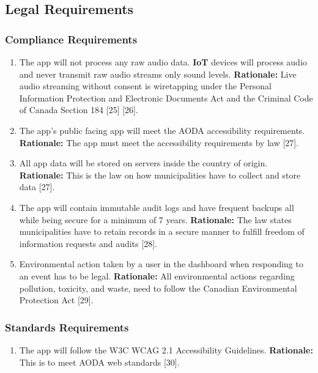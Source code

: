 \documentclass[]{article}
\begin{document}

\subsection{Legal Requirements}
\label{sub:legal_requirements}

\subsubsection{Compliance Requirements}
\label{ssub:compliance_requirements}
\begin{enumerate}[{LR-COMP}1. ]
	\item The app will not process any raw audio data. \textbf{IoT} devices will process audio and never transmit raw audio streams only sound levels.\newline
	{\bf Rationale:} Live audio streaming without consent is wiretapping under the Personal Information Protection and Electronic Documents Act and the Criminal Code of Canada Section 184 [25] [26].
	\item The app's public facing app will meet the AODA accessibility requirements.\newline
	{\bf Rationale:} The app must meet the accessibility requirements by law [27].
	\item All app data will be stored on servers inside the country of origin.\newline
	{\bf Rationale:} This is the law on how municipalities have to collect and store data [27].
	\item The app will contain immutable audit logs and have frequent backups all while being secure for a minimum of 7 years.\newline
	{\bf Rationale:} The law states municipalities have to retain records in a secure manner to fulfill freedom of information requests and audits [28].
	\item Environmental action taken by a user in the dashboard when responding to an event has to be legal.\newline
	{\bf Rationale:} All environmental actions regarding pollution, toxicity, and waste, need to follow the Canadian Environmental Protection Act [29].
\end{enumerate}

\subsubsection{Standards Requirements}
\label{ssub:standards_requirements}
\begin{enumerate}[{LR-STD}1. ]
	\item The app will follow the W3C WCAG 2.1 Accessibility Guidelines.\newline
	{\bf Rationale:} This is to meet AODA web standards [30].
\end{enumerate}
\end{document}
